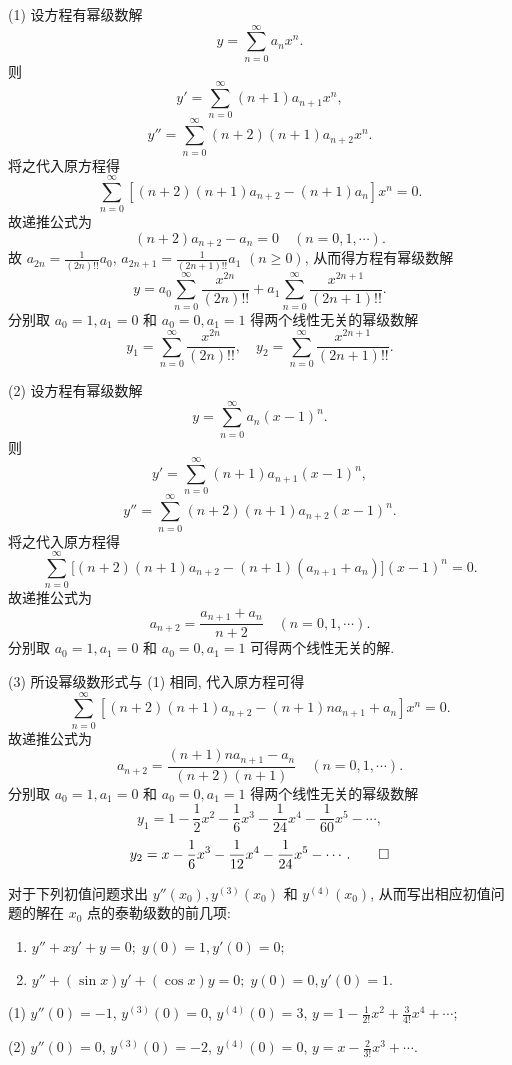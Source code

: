 \begin{solution}
  (1) 设方程有幂级数解
  \[y=\sum_{n=0}^{\infty}a_nx^n.\]
  则
  \[y'=\sum_{n=0}^{\infty}(n+1)a_{n+1}x^n,\]
  \[y''=\sum_{n=0}^{\infty}(n+2)(n+1)a_{n+2}x^n.\]
  将之代入原方程得
  \[\sum_{n=0}^{\infty}[(n+2)(n+1)a_{n+2}-(n+1)a_n]x^n=0.\]
  故递推公式为
  \[(n+2)a_{n+2} - a_n = 0 \quad (n = 0,1,\cdots).\]
  故 $a_{2n}=\frac{1}{(2n)!!}a_0$, $a_{2n+1}=\frac{1}{(2n+1)!!}a_1$ $(n\geq 0)$, 从而得方程有幂级数解
  \[y=a_0\sum_{n=0}^{\infty}\frac{x^{2n}}{(2n)!!}+a_1\sum_{n=0}^{\infty}\frac{x^{2n+1}}{(2n+1)!!}.\]
  分别取 $a_0=1,a_1=0$ 和 $a_0=0,a_1=1$ 得两个线性无关的幂级数解
  \[y_1 = \sum_{n=0}^{\infty} \frac{x^{2n}}{(2n)!!},\quad
    y_2 = \sum_{n=0}^{\infty} \frac{x^{2n+1}}{(2n+1)!!}.\]

  (2) 设方程有幂级数解
  \[y = \sum_{n=0}^{\infty}a_n(x-1)^n.\]
  则
  \[y' = \sum_{n=0}^{\infty}(n+1)a_{n+1}(x-1)^n,\]
  \[y'' = \sum_{n=0}^{\infty}(n+2)(n+1)a_{n+2}(x-1)^n.\]
  将之代入原方程得
  \[\sum_{n=0}^{\infty} \big[(n+2)(n+1)a_{n+2}-(n+1)(a_{n+1}+a_n)\big](x-1)^n = 0.\]
  故递推公式为
  \[a_{n+2} = \frac{a_{n+1}+a_n}{n+2}\quad (n = 0,1,\cdots).\]
  分别取 $a_0=1,a_1=0$ 和 $a_0=0,a_1=1$ 可得两个线性无关的解.

  (3) 所设幂级数形式与 (1) 相同, 代入原方程可得
  \[\sum_{n=0}^{\infty}[(n+2)(n+1)a_{n+2}-(n+1)na_{n+1}+a_n]x^n=0.\]
  故递推公式为
  \[a_{n+2}=\frac{(n+1)na_{n+1}-a_n}{(n+2)(n+1)}\quad (n=0,1,\cdots).\]
  分别取 $a_0=1,a_1=0$ 和 $a_0=0,a_1=1$ 得两个线性无关的幂级数解
  \[y_1=1-\frac{1}{2}x^2-\frac{1}{6}x^3-\frac{1}{24}x^4-\frac{1}{60}x^5-\cdots,\]
  \[y_2=x-\frac{1}{6}x^3-\frac{1}{12}x^4-\frac{1}{24}x^5-\cdots.\qedhere\]
\end{solution}



\begin{exercise}
  对于下列初值问题求出 $y''(x_0),y^{(3)}(x_0)$ 和 $y^{(4)}(x_0)$, 
  从而写出相应初值问题的解在 $x_0$ 点的泰勒级数的前几项:
  \begin{enumerate}[(1)]
  \item $y''+xy'+y=0;\;y(0)=1,y'(0)=0;$
  \item $y''+(\sin x)y'+(\cos x)y=0;\;y(0)=0,y'(0)=1$.\
  \end{enumerate}
\end{exercise}

\begin{solution}
  (1) $y''(0)=-1$, $y^{(3)}(0)=0$, $y^{(4)}(0)=3$, $y=1-\frac{1}{2!}x^2+\frac{3}{4!}x^4+\cdots$;

  (2) $y''(0)=0$, $y^{(3)}(0)=-2$, $y^{(4)}(0)=0$, $y=x-\frac{2}{3!}x^3+\cdots$.
\end{solution}



